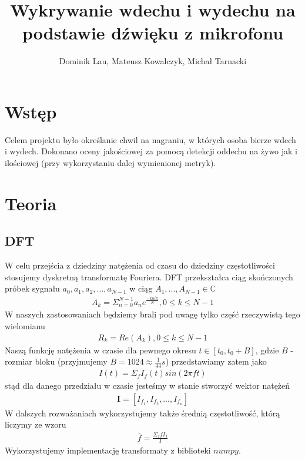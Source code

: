 \documentclass[polish]{article}
\title{Wykrywanie wdechu i wydechu na podstawie dźwięku z mikrofonu}
\author{Dominik Lau, Mateusz Kowalczyk, Michał Tarnacki}
\begin{document}
\maketitle

\section{Wstęp}
Celem projektu było określanie chwil na nagraniu, w których osoba bierze wdech i wydech. 
Dokonano oceny jakościowej za pomocą detekcji oddechu na żywo jak i ilościowej (przy wykorzystaniu
dalej wymienionej metryk).

\section{Teoria}
\subsection{DFT}
W celu przejścia z dziedziny natężenia od czasu do dziedziny częstotliwości stosujemy dyskretną transformatę
Fouriera.  DFT przekształca ciąg skończonych próbek sygnału $a_0, a_1, a_2, ..., a_{N-1}$ w ciąg 
$A_1, ..., A_{N-1} \in \mathbb{C}$
\begin{gather*}
	A_k = \Sigma_{n=0}^{N-1} a_ne^{\frac{-kni\pi}{N}}, 0 \le k \le N-1
\end{gather*}
W naszych zastosowaniach będziemy brali pod uwagę tylko część rzeczywistą tego wielomianu
\begin{gather*}
	R_k = Re(A_k), 0 \le k \le N-1
\end{gather*}
Naszą funkcję natężenia w czasie dla pewnego okresu $t \in [t_0, t_0 + B]$, gdzie $B$ - rozmiar bloku (przyjmujemy $B=1024\approx \frac{1}{44} s$) przedstawiamy zatem jako 
\begin{gather*}
	I(t) = \Sigma_{f} I_{f}(t)sin(2 \pi f t)
\end{gather*}
stąd dla danego przedziału w czasie jesteśmy w stanie stworzyć wektor natężeń
\begin{gather*}
	\boldsymbol{I} = [I_{f_1}, I_{f_2}, ..., I_{f_n}]
\end{gather*}
W dalszych rozważaniach wykorzystujemy także średnią częstotliwość, którą liczymy ze wzoru
\begin{gather*}
	\bar{f} = \frac{\Sigma_ffI_f}{I}
\end{gather*}
Wykorzystujemy implementację transformaty z biblioteki $numpy$.
\end{document}
